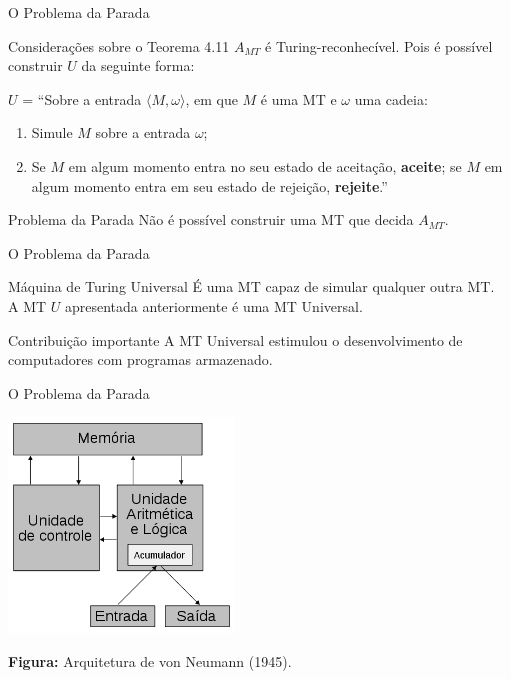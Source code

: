\documentclass[xcolor=dvipsnames,table]{beamer}
\begin{document}
	\begin{frame}{O Problema da Parada}
		\begin{block}{Considerações sobre o Teorema 4.11}
			$A_{MT}$ é Turing-reconhecível. Pois é possível construir $U$ da seguinte forma: \pause
			
			$U$ = ``Sobre a entrada $\langle M, \omega \rangle$, em que $M$ é uma MT e $\omega$ uma cadeia:
			\begin{enumerate}
				\item Simule $M$ sobre a entrada $\omega$;
				\item Se $M$ em algum momento entra no seu estado de aceitação, {\bf aceite}; se $M$ em algum momento entra em seu estado de rejeição, {\bf rejeite}.''
			\end{enumerate}
		\end{block}	\pause
		\begin{alertblock}{Problema da Parada}
			Não é possível construir uma MT que decida $A_{MT}$.
		\end{alertblock} 
	\end{frame}
	
	\begin{frame}{O Problema da Parada}
		\begin{block}{Máquina de Turing Universal}
			É uma MT capaz de simular qualquer outra MT. \\A MT $U$ apresentada anteriormente é uma MT Universal.
		\end{block} \pause
		\begin{exampleblock}{Contribuição importante}
			A MT Universal estimulou o desenvolvimento de computadores com programas armazenado.
		\end{exampleblock} 
	\end{frame}
	
	\begin{frame}{O Problema da Parada}
		\begin{center}
			\includegraphics[width=6cm]{images/arqVonNeumann.png}
			
			{\bf Figura:} Arquitetura de von Neumann (1945).
		\end{center}
	\end{frame}

	\begin{frame}
		\titlepage
	\end{frame}
	
\end{document}
